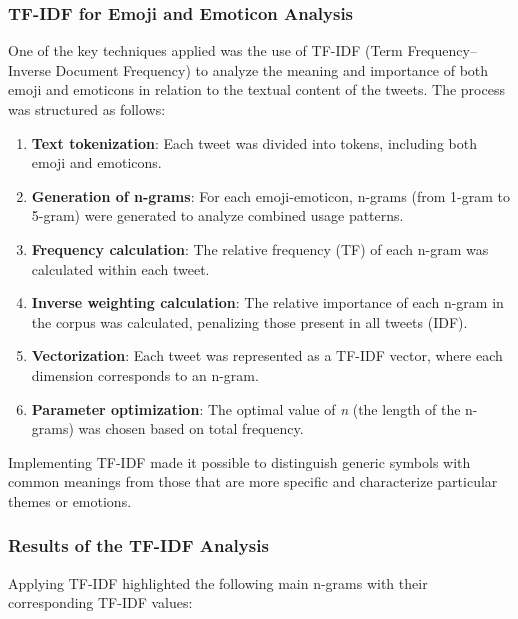 \subsubsection{TF-IDF for Emoji and Emoticon Analysis}
One of the key techniques applied was the use of TF-IDF (Term Frequency–Inverse Document Frequency) to analyze the meaning and importance of both emoji and emoticons in relation to the textual content of the tweets. The process was structured as follows:
\begin{enumerate}
    \item \textbf{Text tokenization}: Each tweet was divided into tokens, including both emoji and emoticons.
    \item \textbf{Generation of n-grams}: For each emoji-emoticon, n-grams (from 1-gram to 5-gram) were generated to analyze combined usage patterns.
    \item \textbf{Frequency calculation}: The relative frequency (TF) of each n-gram was calculated within each tweet.
    \item \textbf{Inverse weighting calculation}: The relative importance of each n-gram in the corpus was calculated, penalizing those present in all tweets (IDF).
    \item \textbf{Vectorization}: Each tweet was represented as a TF-IDF vector, where each dimension corresponds to an n-gram.
    \item \textbf{Parameter optimization}: The optimal value of \textit{n} (the length of the n-grams) was chosen based on total frequency.
\end{enumerate}
Implementing TF-IDF made it possible to distinguish generic symbols with common meanings from those that are more specific and characterize particular themes or emotions.

\subsubsection{Results of the TF-IDF Analysis}
Applying TF-IDF highlighted the following main n-grams with their corresponding TF-IDF values:

